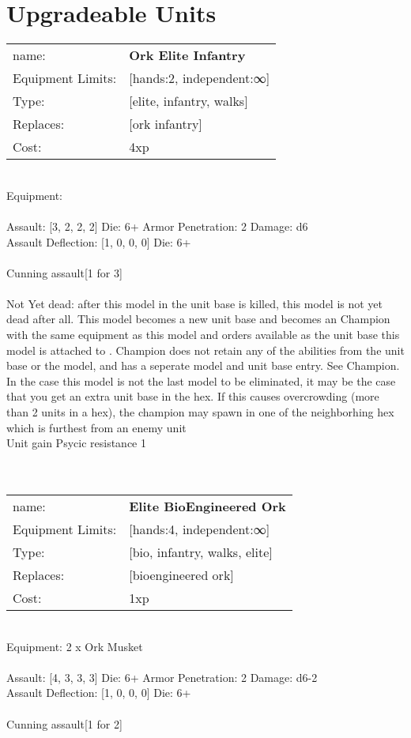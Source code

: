\pagebreak\section{Upgradeable Units}\noindent
\begin{tabular}{ll}
name: &{\bf Ork Elite Infantry } \\
Equipment Limits: &[hands:2, independent:∞] \\
Type: &[elite, infantry, walks] \\
Replaces: &[ork infantry] \\
Cost: & 4xp\\
\end{tabular}
\ \\
Equipment:  \\
\ \\
Assault: [3, 2, 2, 2] Die: 6+ Armor Penetration: 2 Damage: d6 \\
Assault Deflection: [1, 0, 0, 0] Die: 6+\\
\\ 
Cunning assault[1 for 3]\\ 
 
\ \\
Not Yet dead: after this model in the unit base is killed, this model is not yet dead after all. This model becomes a new unit base and becomes an Champion with the same equipment as this model and orders available as the unit base this model is attached to . Champion does not retain any of the abilities from the unit base or the model, and has a seperate model and unit base entry. See Champion. In the case this model is not the last model to be eliminated, it may be the case that you get an extra unit base in the hex. If this causes overcrowding (more than 2 units in a hex), the champion may spawn in one of the neighborhing hex which is furthest from an enemy unit\\ 
Unit gain Psycic resistance 1\\ 

\ \\
 
\ \\

\noindent
\begin{tabular}{ll}
name: &{\bf Elite BioEngineered Ork } \\
Equipment Limits: &[hands:4, independent:∞] \\
Type: &[bio, infantry, walks, elite] \\
Replaces: &[bioengineered ork] \\
Cost: & 1xp\\
\end{tabular}
\ \\
Equipment: 2 x Ork Musket \\
\ \\
Assault: [4, 3, 3, 3] Die: 6+ Armor Penetration: 2 Damage: d6-2 \\
Assault Deflection: [1, 0, 0, 0] Die: 6+\\
\\ 
Cunning assault[1 for 2]\\ 
 
